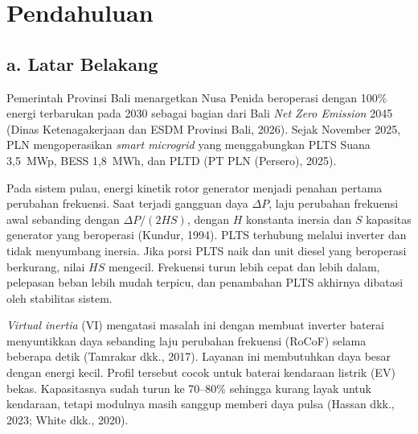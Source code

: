 \documentclass[12pt,a4paper,twocolumn]{article}
\newcommand{\eng}[1]{\textit{#1}}
\begin{document}

\section{Pendahuluan}
\subsection{a. Latar Belakang}
Pemerintah Provinsi Bali menargetkan Nusa Penida beroperasi dengan 100\% energi terbarukan pada 2030 sebagai bagian dari Bali \eng{Net Zero Emission} 2045 (Dinas Ketenagakerjaan dan ESDM Provinsi Bali, 2026). Sejak November 2025, PLN mengoperasikan \eng{smart microgrid} yang menggabungkan PLTS Suana 3,5~MWp, BESS 1,8~MWh, dan PLTD (PT PLN (Persero), 2025).

Pada sistem pulau, energi kinetik rotor generator menjadi penahan pertama perubahan frekuensi. Saat terjadi gangguan daya $\Delta P$, laju perubahan frekuensi awal sebanding dengan $\Delta P/(2HS)$, dengan $H$ konstanta inersia dan $S$ kapasitas generator yang beroperasi (Kundur, 1994). PLTS terhubung melalui inverter dan tidak menyumbang inersia. Jika porsi PLTS naik dan unit diesel yang beroperasi berkurang, nilai $HS$ mengecil. Frekuensi turun lebih cepat dan lebih dalam, pelepasan beban lebih mudah terpicu, dan penambahan PLTS akhirnya dibatasi oleh stabilitas sistem.

\eng{Virtual inertia} (VI) mengatasi masalah ini dengan membuat inverter baterai menyuntikkan daya sebanding laju perubahan frekuensi (RoCoF) selama beberapa detik (Tamrakar dkk., 2017). Layanan ini membutuhkan daya besar dengan energi kecil. Profil tersebut cocok untuk baterai kendaraan listrik (EV) bekas. Kapasitasnya sudah turun ke 70--80\% sehingga kurang layak untuk kendaraan, tetapi modulnya masih sanggup memberi daya pulsa (Hassan dkk., 2023; White dkk., 2020).
\end{document}
